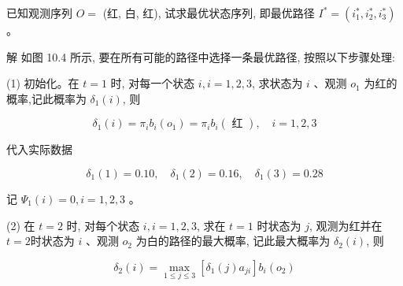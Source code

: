 \documentclass[10pt]{article}
\begin{document}
已知观测序列 $O=$ (红, 白, 红), 试求最优状态序列, 即最优路径 $I^{*}=\left(i_{1}^{*}, i_{2}^{*}, i_{3}^{*}\right)$ 。

解 如图 10.4 所示, 要在所有可能的路径中选择一条最优路径, 按照以下步骤处理:

(1) 初始化。在 $t=1$ 时, 对每一个状态 $i, i=1,2,3$, 求状态为 $i$ 、观测 $o_{1}$ 为红的概率,记此概率为 $\delta_{1}(i)$, 则

$$
\delta_{1}(i)=\pi_{i} b_{i}\left(o_{1}\right)=\pi_{i} b_{i}(\text { 红 }), \quad i=1,2,3
$$

代入实际数据

$$
\delta_{1}(1)=0.10, \quad \delta_{1}(2)=0.16, \quad \delta_{1}(3)=0.28
$$

记 $\Psi_{1}(i)=0, i=1,2,3$ 。

(2) 在 $t=2$ 时, 对每个状态 $i, i=1,2,3$, 求在 $t=1$ 时状态为 $j$, 观测为红并在 $t=2$时状态为 $i$ 、观测 $o_{2}$ 为白的路径的最大概率, 记此最大概率为 $\delta_{2}(i)$, 则

$$
\delta_{2}(i)=\max _{1 \leqslant j \leqslant 3}\left[\delta_{1}(j) a_{j i}\right] b_{i}\left(o_{2}\right)
$$
\end{document}
